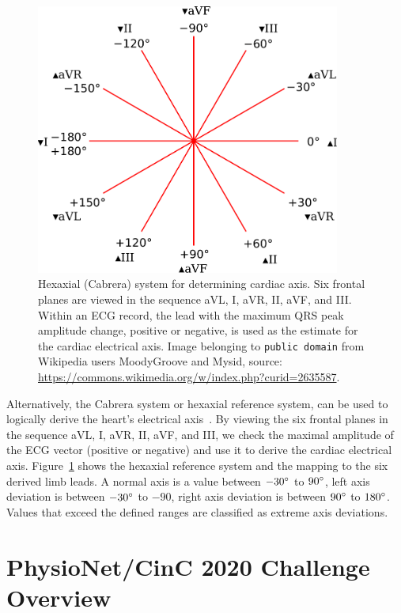 \documentclass[\main/thesis.tex]{subfiles}
\begin{document}
\begin{figure}
    \centering
    \includegraphics[width=10cm]{figure/Hexaxial_reference_system.pdf}
    \caption[Hexaxial (Cabrera) system for determining cardiac axis. Six frontal planes are viewed in the sequence aVL, I, aVR, II, aVF, and III.]{Hexaxial (Cabrera) system for determining cardiac axis. Six frontal planes are viewed in the sequence aVL, I, aVR, II, aVF, and III. Within an ECG record, the lead with the maximum QRS peak amplitude change, positive or negative, is used as the estimate for the cardiac electrical axis.
    Image belonging to \texttt{public domain} from Wikipedia users MoodyGroove and Mysid, source: \url{https://commons.wikimedia.org/w/index.php?curid=2635587}.
    }
    \label{fig:hexaxial_reference}
\end{figure}

Alternatively, the Cabrera system or hexaxial reference system, can be used to logically derive the heart's electrical axis~\cite{lam_classical_2015}.
By viewing the six frontal planes in the sequence aVL, I, aVR, II, aVF, and III, we check the maximal amplitude of the ECG vector (positive or negative) and use it to derive the cardiac electrical axis.
Figure~\ref{fig:hexaxial_reference} shows the hexaxial reference system and the mapping to the six derived limb leads.
A normal axis is a value between $-30\degree$ to $90\degree$, left axis deviation is between $-30\degree$ to $-90$, right axis deviation is between $90\degree$ to $180\degree$.
Values that exceed the defined ranges are classified as extreme axis deviations.

\section{PhysioNet/CinC 2020 Challenge Overview}
\end{document}

